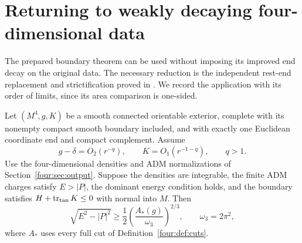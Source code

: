 \section{Returning to weakly decaying four-dimensional data}
\label{b:four-transfer}

The prepared boundary theorem can be used without imposing its improved
end decay on the original data.  The necessary reduction is the
independent rest-end replacement and strictification proved in
\cite[Proposition~8.8 and Lemma~8.9]{NumericalCompanion}.  We record
the application with its order of limits, since its area comparison
is one-sided.

\begin{corollary}
\label{b:four-weak}
Let $(M^4,g,K)$ be a smooth connected orientable exterior, complete with
its nonempty compact smooth boundary included, and with exactly one
Euclidean coordinate end and compact complement.  Assume
\[
 g-\delta=O_2(r^{-q}),\qquad K=O_1(r^{-1-q}),\qquad q>1.
\]
Use the four-dimensional densities and ADM normalizations of
Section~\ref{four:sec:output}.  Suppose the densities are integrable,
the finite ADM charges satisfy $E>|P|$, the dominant energy condition
holds, and the boundary satisfies $H+\operatorname{tr}_{\mathrm{tan}}K\le0$ with
normal into $M$.  Then
\[
 \sqrt{E^2-|P|^2}\ge
       \frac12\left(\frac{A_*(g)}{\omega_3}\right)^{2/3},
 \qquad \omega_3=2\pi^2,
\]
where $A_*$ uses every full cut of Definition~\ref{four:def:cuts}.
\end{corollary}

